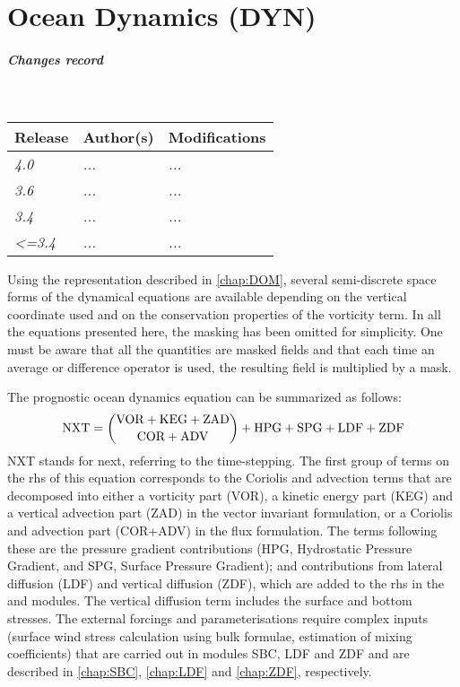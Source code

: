 \documentclass[../main/NEMO_manual]{subfiles}
\begin{document}
\chapter{Ocean Dynamics (DYN)}
\label{chap:DYN}

\chaptertoc

\paragraph{Changes record} ~\\

{\footnotesize
  \begin{tabularx}{\textwidth}{l||X|X}
    Release & Author(s) & Modifications \\
    \hline
    {\em   4.0} & {\em ...} & {\em ...} \\
    {\em   3.6} & {\em ...} & {\em ...} \\
    {\em   3.4} & {\em ...} & {\em ...} \\
    {\em <=3.4} & {\em ...} & {\em ...}
  \end{tabularx}
}

\clearpage

Using the representation described in \autoref{chap:DOM},
several semi-discrete space forms of the dynamical equations are available depending on
the vertical coordinate used and on the conservation properties of the vorticity term.
In all the equations presented here, the masking has been omitted for simplicity.
One must be aware that all the quantities are masked fields and
that each time an average or difference operator is used, the resulting field is multiplied by a mask.

The prognostic ocean dynamics equation can be summarized as follows:
\[
  \text{NXT} = \dbinom	{\text{VOR} + \text{KEG} + \text {ZAD} }
  {\text{COR} + \text{ADV}                       }
  + \text{HPG} + \text{SPG} + \text{LDF} + \text{ZDF}
\]
NXT stands for next, referring to the time-stepping.
The first group of terms on the rhs of this equation corresponds to the Coriolis and advection terms that
are decomposed into either a vorticity part (VOR), a kinetic energy part (KEG) and
a vertical advection part (ZAD) in the vector invariant formulation,
or a Coriolis and advection part (COR+ADV) in the flux formulation.
The terms following these are the pressure gradient contributions
(HPG, Hydrostatic Pressure Gradient, and SPG, Surface Pressure Gradient);
and contributions from lateral diffusion (LDF) and vertical diffusion (ZDF),
which are added to the rhs in the  and  modules.
The vertical diffusion term includes the surface and bottom stresses.
The external forcings and parameterisations require complex inputs
(surface wind stress calculation using bulk formulae, estimation of mixing coefficients)
that are carried out in modules SBC, LDF and ZDF and are described in
\autoref{chap:SBC}, \autoref{chap:LDF} and \autoref{chap:ZDF}, respectively.
\end{document}
